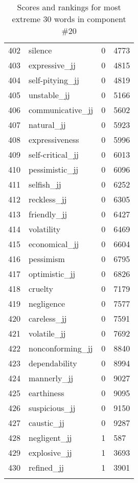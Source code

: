 \begin{longtable}[!htbp]{| rlr@{.}l |}
    402 & silence & 0 & 4773 \\
    403 & expressive\_jj & 0 & 4815 \\
    404 & self-pitying\_jj & 0 & 4819 \\
    405 & unstable\_jj & 0 & 5166 \\
    406 & communicative\_jj & 0 & 5602 \\
    407 & natural\_jj & 0 & 5923 \\
    408 & expressiveness & 0 & 5996 \\
    409 & self-critical\_jj & 0 & 6013 \\
    410 & pessimistic\_jj & 0 & 6096 \\
    411 & selfish\_jj & 0 & 6252 \\
    412 & reckless\_jj & 0 & 6305 \\
    413 & friendly\_jj & 0 & 6427 \\
    414 & volatility & 0 & 6469 \\
    415 & economical\_jj & 0 & 6604 \\
    416 & pessimism & 0 & 6795 \\
    417 & optimistic\_jj & 0 & 6826 \\
    418 & cruelty & 0 & 7179 \\
    419 & negligence & 0 & 7577 \\
    420 & careless\_jj & 0 & 7591 \\
    421 & volatile\_jj & 0 & 7692 \\
    422 & nonconforming\_jj & 0 & 8840 \\
    423 & dependability & 0 & 8994 \\
    424 & mannerly\_jj & 0 & 9027 \\
    425 & earthiness & 0 & 9095 \\
    426 & suspicious\_jj & 0 & 9150 \\
    427 & caustic\_jj & 0 & 9287 \\
    428 & negligent\_jj & 1 & 587 \\
    429 & explosive\_jj & 1 & 3693 \\
    430 & refined\_jj & 1 & 3901 \\
    \hline
    \caption{Scores and rankings for most extreme 30 words in component \#20} \\
\end{longtable}
